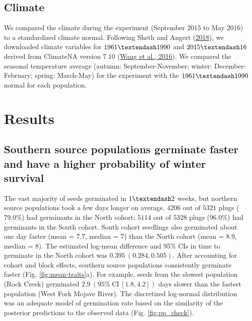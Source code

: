 \documentclass[
  12pt,
]{article}
\begin{document}
\hypertarget{climate}{%
\subsection{Climate}\label{climate}}

We compared the climate during the experiment (September \(2015\) to May \(2016\)) to a standardized climate normal. Following Sheth and Angert (\protect\hyperlink{ref-sheth_demographic_2018}{2018}), we downloaded climate variables for \(1961 \textendash 1990\) and \(2015 \textendash 16\) derived from ClimateNA version \(7.10\) (\protect\hyperlink{ref-wang_locally_2016}{Wang et al., 2016}). We compared the seasonal temperature average (autumn: September-November; winter: December-February; spring: March-May) for the experiment with the \(1961 \textendash 1990\) normal for each population.

\hypertarget{results}{%
\section{Results}\label{results}}

\hypertarget{southern-source-populations-germinate-faster-and-have-a-higher-probability-of-winter-survival}{%
\subsection{Southern source populations germinate faster and have a higher probability of winter survival}\label{southern-source-populations-germinate-faster-and-have-a-higher-probability-of-winter-survival}}

The vast majority of seeds germinated in \(1 \textendash 2\) weeks, but northern source populations took a few days longer on average. \(4206\) out of \(5321\) plugs (\(79.0\)\%) had germinants in the North cohort; \(5114\) out of \(5328\) plugs (\(96.0\)\%) had germinants in the South cohort. South cohort seedlings also germinated about one day faster (mean = \(7.7\), median = \(7\)) than the North cohort (mean = \(8.9\), median = \(8\)). The estimated log-mean difference and 95\% CIs in time to germinate in the North cohort was \(0.395~(0.284, 0.505)\). After accounting for cohort and block effects, southern source populations consistently germinate faster (Fig. \ref{fig:mean-traits}a). For example, seeds from the slowest population (Rock Creek) germinated \(2.9~(95\%~\text{CI}~[1.8,4.2])\) days slower than the fastest population (West Fork Mojave River). The discretized log-normal distribution was an adequate model of germination rate based on the similarity of the posterior predictions to the observed data (Fig. \ref{fig:pp_check}).
\end{document}
